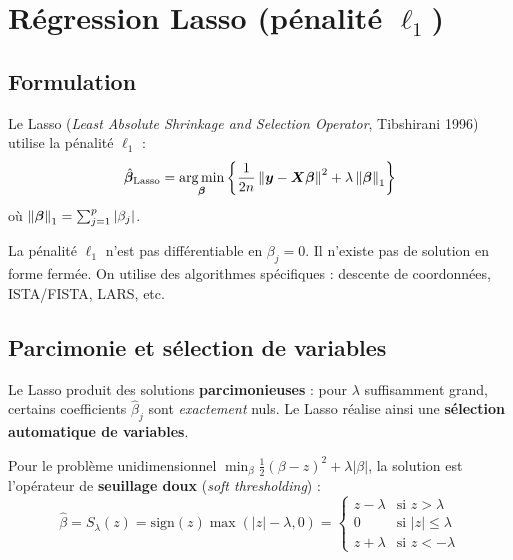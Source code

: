 \section{R\'egression Lasso (p\'enalit\'e $\ell_1$)}
\label{sec:lasso}

\subsection{Formulation}

\begin{definition}
Le Lasso (\emph{Least Absolute Shrinkage and Selection Operator}, Tibshirani 1996)
utilise la p\'enalit\'e $\ell_1$ :
\[
  \hat{\bm{\beta}}_{\text{Lasso}} = \operatorname*{arg\,min}_{\bm{\beta}} \left\{
    \frac{1}{2n}\left\| \bm{y} - \bm{X}\bm{\beta} \right\|^2 + \lambda \left\| \bm{\beta} \right\|_1
  \right\}
\]
o\`u $\left\| \bm{\beta} \right\|_1 = \sum_{j=1}^{p} |\beta_j|$.
\end{definition}

\begin{attention}[title=\textbf{Pas de solution analytique}]
La p\'enalit\'e $\ell_1$ n'est pas diff\'erentiable en $\beta_j = 0$. Il n'existe pas
de solution en forme ferm\'ee. On utilise des algorithmes sp\'ecifiques : descente de
coordonn\'ees, ISTA/FISTA, LARS, etc.
\end{attention}

\subsection{Parcimonie et s\'election de variables}

\begin{theoreme}
Le Lasso produit des solutions \textbf{parcimonieuses} : pour $\lambda$ suffisamment
grand, certains coefficients $\hat{\beta}_j$ sont \emph{exactement} nuls.
Le Lasso r\'ealise ainsi une \textbf{s\'election automatique de variables}.
\end{theoreme}

\begin{lemme}
\label{lem:soft-threshold}
Pour le probl\`eme unidimensionnel
$\min_{\beta} \frac{1}{2}(\beta - z)^2 + \lambda|\beta|$,
la solution est l'op\'erateur de \textbf{seuillage doux} (\emph{soft thresholding}) :
\[
  \hat{\beta} = S_\lambda(z) = \text{sign}(z)\max(|z| - \lambda, 0)
  = \begin{cases}
    z - \lambda & \text{si } z > \lambda \\
    0 & \text{si } |z| \leq \lambda \\
    z + \lambda & \text{si } z < -\lambda
  \end{cases}
\]
\end{lemme}

